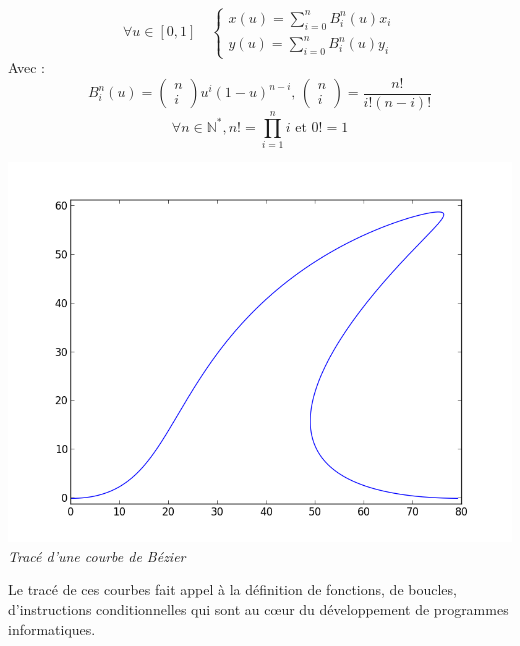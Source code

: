 \documentclass[10pt,fleqn]{article} %
\begin{document}
\begin{minipage}[c]{.45\linewidth}

$$
\forall u \in [0,1] \quad 
\left\{
\begin{array}{l}
x(u)=\sum\limits_{i=0}^{n}B_i^n(u)x_i\\
y(u)=\sum\limits_{i=0}^{n}B_i^n(u)y_i
\end{array}
\right.
$$
Avec :
$$
B_i^n(u)=\left(
\begin{array}{c}
n\\
i
\end{array}\right)u^i\left(1-u \right)^{n-i}
\text{, }
\left(
\begin{array}{c}
n\\
i
\end{array}\right)=\dfrac{n!}{i!(n-i)!}$$
$$
 \forall n\in\mathbb{N^*}, n!=\prod\limits_{i=1}^{n}i \text{ et } 0!=1
 $$


\end{minipage} \hfill
\begin{minipage}[c]{.45\linewidth}
\begin{center}
\includegraphics[width=.9\textwidth]{images/shark.png}
\textit{Tracé d'une courbe de Bézier}
\end{center}
\end{minipage}

\vspace{.5cm}




Le tracé de ces courbes fait appel à la définition de fonctions, de boucles, d'instructions conditionnelles qui sont au c\oe{}ur du développement de programmes informatiques. 
\end{document}
